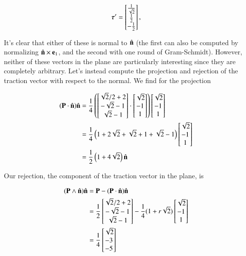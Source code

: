 {\begin{equation}\label{eqn:continuumProblemSet1:470}
\boldsymbol{\tau}' = 
\begin{bmatrix}
\frac{1}{\sqrt{2}} \\
\frac{1}{2} \\
-\frac{1}{2}
\end{bmatrix},
\end{equation}

It's clear that either of these is normal to $\hat{\mathbf{n}}$ (the first can also be computed by normalizing $\hat{\mathbf{n}} \times \mathbf{e}_1$, and the second with one round of Gram-Schmidt).  However, neither of these vectors in the plane are particularly interesting since they are completely arbitrary.  Let's instead compute the projection and rejection of the traction vector with respect to the normal.  We find for the projection

\begin{align*}
(\mathbf{P} \cdot \hat{\mathbf{n}}) \hat{\mathbf{n}}
&=
\frac{1}{4}
\left(
\begin{bmatrix}
\sqrt{2}/2 + 2 \\
-\sqrt{2} -1 \\
\sqrt{2} - 1
\end{bmatrix}
\cdot 
\begin{bmatrix}
\sqrt{2} \\
-1 \\
1
\end{bmatrix} 
\right)
\begin{bmatrix}
\sqrt{2} \\
-1 \\
1
\end{bmatrix}  \\
&=
\frac{1}{4}
\left( 
1 + 2\sqrt{2}
+\sqrt{2} +1 
+\sqrt{2} - 1
\right)
\begin{bmatrix}
\sqrt{2} \\
-1 \\
1
\end{bmatrix}  \\
&=
\frac{1}{2}
\left( 
1 + 4\sqrt{2}
\right)
\hat{\mathbf{n}}
\end{align*}

Our rejection, the component of the traction vector in the plane, is

\begin{align*}
(\mathbf{P} \wedge \hat{\mathbf{n}}) \hat{\mathbf{n}} 
&=
\mathbf{P} - (\mathbf{P} \cdot \hat{\mathbf{n}})\hat{\mathbf{n}} \\
&=
\frac{1}{2}
\begin{bmatrix}
\sqrt{2}/2 + 2 \\
-\sqrt{2} -1 \\
\sqrt{2} - 1
\end{bmatrix}
-\frac{1}{4}(1 + r \sqrt{2})
\begin{bmatrix}
\sqrt{2} \\
-1 \\
1
\end{bmatrix} \\
&=
\frac{1}{4}
\begin{bmatrix}
\sqrt{2} \\
-3 \\
-5
\end{bmatrix}
\end{align*}

}
